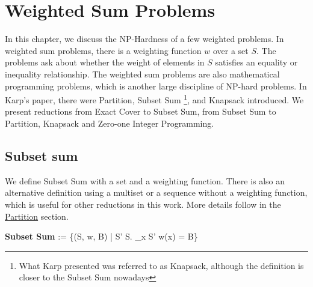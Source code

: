 \chapter{Weighted Sum Problems}\label{chapter:weighted}
In this chapter, we discuss the NP-Hardness of a few weighted problems. In weighted sum problems, 
there is a weighting function $w$ over a set $S$. The problems ask about whether the weight of elements 
in $S$ satisfies an equality or inequality relationship. The weighted sum problems are also mathematical programming 
problems, which is another large discipline of NP-hard problems. In Karp's paper, there were Partition, Subset Sum \footnote{What Karp presented was referred to as Knapsack, although
the definition is closer to the Subset Sum nowadays}, and Knapsack introduced. 
We present reductions from Exact Cover to Subset Sum, from Subset Sum to Partition, Knapsack and Zero-one Integer Programming. 

\section{Subset sum}
We define Subset Sum with a set and a weighting function. There is also an alternative definition using a multiset or a sequence without 
a weighting function, which is useful for other reductions in this work. More details follow in the \hyperref[sec:partition]{Partition} section. 
\begin{myalign}
    \textbf{Subset Sum} := \{(S, w, B) | \exists S' \subseteq S. \sum_{x \in S'} w(x) = B\}
\end{myalign}

